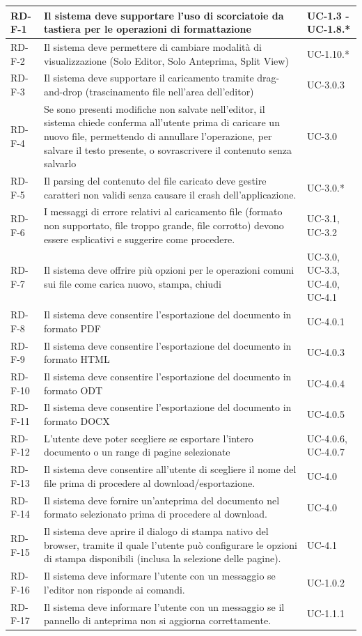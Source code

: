 \documentclass[11pt,a4paper]{article}
\begin{document}
\begin{longtable}{|p{}|>{\raggedright\arraybackslash}p{}|p{}|}
RD-F-1 & Il sistema deve supportare l'uso di scorciatoie da tastiera per le operazioni di formattazione & UC-1.3 - UC-1.8.* \\
\hline
RD-F-2 & Il sistema deve permettere di cambiare modalità di visualizzazione (Solo Editor, Solo Anteprima, Split View) & UC-1.10.* \\
\hline
RD-F-3 & Il sistema deve supportare il caricamento tramite drag-and-drop (trascinamento file nell'area dell'editor) & UC-3.0.3 \\
\hline
RD-F-4 & Se sono presenti modifiche non salvate nell'editor, il sistema chiede conferma all'utente prima di caricare un nuovo file, permettendo di annullare l'operazione, per salvare il testo presente, o sovrascrivere il contenuto senza salvarlo & UC-3.0 \\
\hline
RD-F-5 & Il parsing del contenuto del file caricato deve gestire caratteri non validi senza causare il crash dell'applicazione. & UC-3.0.* \\
\hline
RD-F-6 & I messaggi di errore relativi al caricamento file (formato non supportato, file troppo grande, file corrotto) devono essere esplicativi e suggerire come procedere. & UC-3.1, UC-3.2 \\
\hline
RD-F-7 & Il sistema deve offrire più opzioni per le operazioni comuni sui file come carica nuovo, stampa, chiudi & UC-3.0, UC-3.3, UC-4.0, UC-4.1\\
\hline
RD-F-8 & Il sistema deve consentire l'esportazione del documento in formato PDF & UC-4.0.1 \\
\hline
RD-F-9 & Il sistema deve consentire l'esportazione del documento in formato HTML & UC-4.0.3 \\
\hline
RD-F-10 & Il sistema deve consentire l'esportazione del documento in formato ODT & UC-4.0.4 \\
\hline
RD-F-11 & Il sistema deve consentire l'esportazione del documento in formato DOCX & UC-4.0.5 \\
\hline
RD-F-12 & L'utente deve poter scegliere se esportare l'intero documento o un range di pagine selezionate & UC-4.0.6, UC-4.0.7\\
\hline
RD-F-13 & Il sistema deve consentire all'utente di scegliere il nome del file prima di procedere al download/esportazione. & UC-4.0 \\
\hline
RD-F-14 & Il sistema deve fornire un'anteprima del documento nel formato selezionato prima di procedere al download. & UC-4.0 \\
\hline
RD-F-15 & Il sistema deve aprire il dialogo di stampa nativo del browser, tramite il quale l'utente può configurare le opzioni di stampa disponibili (inclusa la selezione delle pagine). & UC-4.1 \\
\hline
RD-F-16 & Il sistema deve informare l'utente con un messaggio se l'editor non risponde ai comandi. & UC-1.0.2 \\
\hline
RD-F-17 & Il sistema deve informare l'utente con un messaggio se il pannello di anteprima non si aggiorna correttamente. & UC-1.1.1 \\
\hline


\end{longtable}
\end{document}
